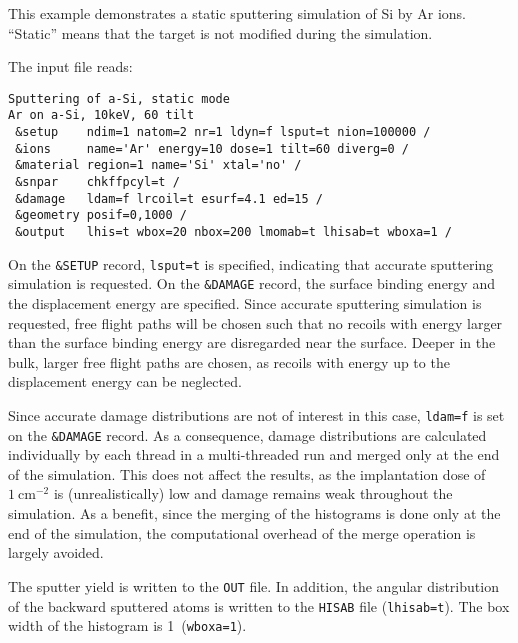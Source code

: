This example demonstrates a static sputtering simulation of Si by Ar ions.
``Static'' means that the target is not modified during the simulation.

The input file reads:

\begin{verbatim}
Sputtering of a-Si, static mode
Ar on a-Si, 10keV, 60 tilt
 &setup    ndim=1 natom=2 nr=1 ldyn=f lsput=t nion=100000 /
 &ions     name='Ar' energy=10 dose=1 tilt=60 diverg=0 /
 &material region=1 name='Si' xtal='no' /
 &snpar    chkffpcyl=t /
 &damage   ldam=f lrcoil=t esurf=4.1 ed=15 /
 &geometry posif=0,1000 /
 &output   lhis=t wbox=20 nbox=200 lmomab=t lhisab=t wboxa=1 /
\end{verbatim}

On the \texttt{\&SETUP} record, \texttt{lsput=t} is specified, indicating that
accurate sputtering simulation is requested. On the \texttt{\&DAMAGE} record,
the surface binding energy and the displacement energy are specified. Since
accurate sputtering simulation is requested, free flight paths will be chosen
such that no recoils with energy larger than the surface binding energy are
disregarded near the surface. Deeper in the bulk, larger free flight paths are
chosen, as recoils with energy up to the displacement energy can be neglected.

Since accurate damage distributions are not of interest in this case,
\texttt{ldam=f} is set on the \texttt{\&DAMAGE} record. As a consequence, damage
distributions are calculated individually by each thread in a multi-threaded run
and merged only at the end of the simulation. This does not affect the results,
as the implantation dose of $1~\mathrm{cm}^{-2}$ is (unrealistically) low and
damage remains weak throughout the simulation. As a benefit, since the merging
of the histograms is done only at the end of the simulation, the computational
overhead of the merge operation is largely avoided.

The sputter yield is written to the \texttt{OUT} file. In addition, the angular
distribution of the backward sputtered atoms is written to the \texttt{HISAB}
file (\texttt{lhisab=t}). The box width of the histogram is 1\textdegree\
(\texttt{wboxa=1}).
